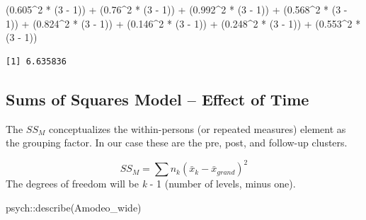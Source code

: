 \documentclass[
  11pt,
]{book}
\newenvironment{Shaded}{\begin{snugshade}}{\end{snugshade}}
\newcommand{\DecValTok}[1]{\textcolor[rgb]{0.00,0.00,0.81}{#1}}
\newcommand{\FloatTok}[1]{\textcolor[rgb]{0.00,0.00,0.81}{#1}}
\newcommand{\FunctionTok}[1]{\textcolor[rgb]{0.00,0.00,0.00}{#1}}
\newcommand{\NormalTok}[1]{#1}
\newcommand{\SpecialCharTok}[1]{\textcolor[rgb]{0.00,0.00,0.00}{#1}}
\begin{document}
\begin{Shaded}
\begin{Highlighting}[]
\NormalTok{(}\FloatTok{0.605}\SpecialCharTok{\^{}}\DecValTok{2} \SpecialCharTok{*}\NormalTok{ (}\DecValTok{3} \SpecialCharTok{{-}} \DecValTok{1}\NormalTok{)) }\SpecialCharTok{+}\NormalTok{ (}\FloatTok{0.76}\SpecialCharTok{\^{}}\DecValTok{2} \SpecialCharTok{*}\NormalTok{ (}\DecValTok{3} \SpecialCharTok{{-}} \DecValTok{1}\NormalTok{)) }\SpecialCharTok{+}\NormalTok{ (}\FloatTok{0.992}\SpecialCharTok{\^{}}\DecValTok{2} \SpecialCharTok{*}\NormalTok{ (}\DecValTok{3} \SpecialCharTok{{-}} \DecValTok{1}\NormalTok{)) }\SpecialCharTok{+}\NormalTok{ (}\FloatTok{0.568}\SpecialCharTok{\^{}}\DecValTok{2} \SpecialCharTok{*}
\NormalTok{    (}\DecValTok{3} \SpecialCharTok{{-}} \DecValTok{1}\NormalTok{)) }\SpecialCharTok{+}\NormalTok{ (}\FloatTok{0.824}\SpecialCharTok{\^{}}\DecValTok{2} \SpecialCharTok{*}\NormalTok{ (}\DecValTok{3} \SpecialCharTok{{-}} \DecValTok{1}\NormalTok{)) }\SpecialCharTok{+}\NormalTok{ (}\FloatTok{0.146}\SpecialCharTok{\^{}}\DecValTok{2} \SpecialCharTok{*}\NormalTok{ (}\DecValTok{3} \SpecialCharTok{{-}} \DecValTok{1}\NormalTok{)) }\SpecialCharTok{+}\NormalTok{ (}\FloatTok{0.248}\SpecialCharTok{\^{}}\DecValTok{2} \SpecialCharTok{*}\NormalTok{ (}\DecValTok{3} \SpecialCharTok{{-}}
    \DecValTok{1}\NormalTok{)) }\SpecialCharTok{+}\NormalTok{ (}\FloatTok{0.553}\SpecialCharTok{\^{}}\DecValTok{2} \SpecialCharTok{*}\NormalTok{ (}\DecValTok{3} \SpecialCharTok{{-}} \DecValTok{1}\NormalTok{))}
\end{Highlighting}
\end{Shaded}

\begin{verbatim}
[1] 6.635836
\end{verbatim}

\hypertarget{sums-of-squares-model-effect-of-time}{%
\subsection{Sums of Squares Model -- Effect of Time}\label{sums-of-squares-model-effect-of-time}}

The \(SS_{M}\) conceptualizes the within-persons (or repeated measures) element as the grouping factor. In our case these are the pre, post, and follow-up clusters.

\[SS_{M}= \sum n_{k}(\bar{x}_{k}-\bar{x}_{grand})^{2}\]
The degrees of freedom will be \emph{k} - 1 (number of levels, minus one).

\begin{Shaded}
\begin{Highlighting}[]
\NormalTok{psych}\SpecialCharTok{::}\FunctionTok{describe}\NormalTok{(Amodeo\_wide)}
\end{Highlighting}
\end{Shaded}
\end{document}
